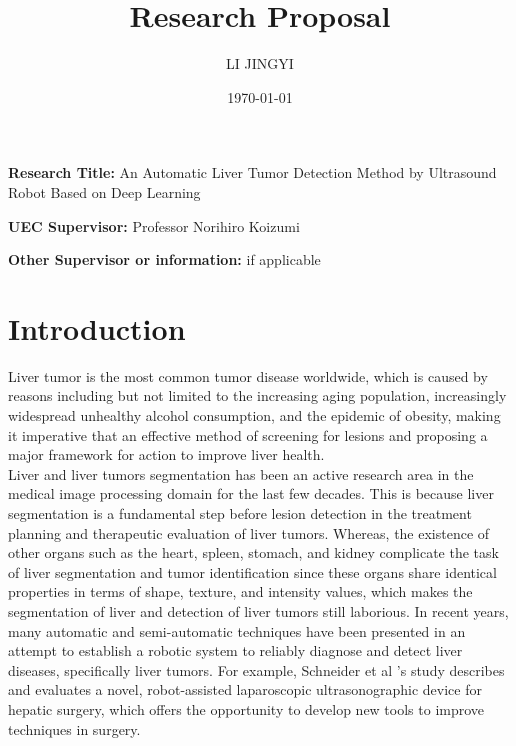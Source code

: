 \documentclass[12pt, a4paper]{article}
\title{Research Proposal}
\author{LI JINGYI}
\date{\today}
\newcommand{\namelistlabel}[1]{\mbox{#1}\hfil}
\newenvironment{namelist}[1]{%
	\begin{list}{}
		{
			\let\makelabel\namelistlabel
			\settowidth{\labelwidth}{#1}
			\setlength{\leftmargin}{1.1\labelwidth}
		}
	}{%
\end{list}}
\begin{document}

	\maketitle
	
	\begin{namelist}{xxxxxxxxxxxx}
		\item[{\bf Research Title:}]
		An Automatic Liver Tumor Detection Method by Ultrasound Robot Based on Deep Learning
		\item[{\bf UEC Supervisor:}]
		Professor Norihiro Koizumi 
		\item[{\bf Other Supervisor or information:}]
		if applicable
	\end{namelist}

\newpage
\tableofcontents
\newpage


\section{Introduction} 



\setlength{\parindent}{1em}
Liver tumor is the most common tumor disease worldwide\cite{r1}, which is caused by reasons including but not limited to the increasing aging population, increasingly widespread unhealthy alcohol consumption, and the epidemic of obesity\cite{r2}, making it imperative that an effective method of screening for lesions and proposing a major framework for action to improve liver health.\\

\setlength{\parindent}{1em}
Liver and liver tumors segmentation has been an active research area in the medical image processing domain for the last few decades. This is because liver segmentation is a fundamental step before lesion detection in the treatment planning and therapeutic evaluation of liver tumors\cite{r3}. Whereas, the existence of other organs such as the heart, spleen, stomach, and kidney complicate the task of liver segmentation and tumor identification since these organs share identical properties in terms of shape, texture, and intensity values, which makes the segmentation of liver and detection of liver tumors still laborious\cite{r4}. In recent years, many automatic and semi-automatic techniques have been presented in an attempt to establish a robotic system to reliably diagnose and detect liver diseases, specifically liver tumors. For example, Schneider et al\cite{r5} ’s study describes and evaluates a novel, robot-assisted laparoscopic ultrasonographic device for hepatic surgery, which offers the opportunity to develop new tools to improve techniques in surgery.\\
\end{document}
